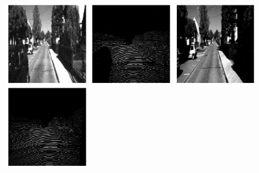 \begin{figure}[t!]
\includegraphics[width=0.32\textwidth]{images/gray_image3.png}
\includegraphics[width=0.32\textwidth]{images/height_image3.png}
\includegraphics[width=0.32\textwidth]{images/gray_image4.png}
\includegraphics[width=0.32\textwidth]{images/height_image4.png}

\end{figure}
